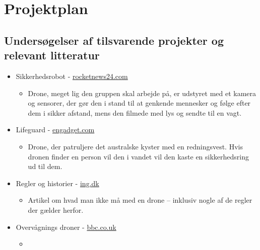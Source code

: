 \documentclass[Main]{subfiles}
\begin{document}
\chapter{Projektplan}


\section{Undersøgelser af tilsvarende projekter og relevant litteratur}


	\begin{itemize}
	\item Sikkerhedsrobot - \href{http://en.rocketnews24.com/2012/12/29/secom-unveils-worlds-first-flying-crime-prevention-robot/}{rocketnews24.com}
	
		\begin{itemize}
		\item Drone, meget lig den gruppen skal arbejde på, er udstyret med et kamera og sensorer, der gør den i stand til at genkende mennesker og følge efter dem i sikker afstand, mens den filmede med lys og sendte til en vagt.
		\end{itemize}
	
	
	\item Lifeguard - \href{http://www.engadget.com/2012/09/19/uav-lifeguards-to-patrol-australian-beaches/}{engadget.com}
	
		\begin{itemize}
		\item Drone, der patruljere det australske kyster med en redningsvest. 
		Hvis dronen finder en person vil den i vandet vil den kaste en  sikkerhedsring ud til dem.
		\end{itemize}
	
	
	\item Regler og historier - \href{http://ing.dk/artikel/foerste-droneflyver-meldt-til-politiet-159138}{ing.dk}
	
		\begin{itemize}
		\item Artikel om hvad man ikke må med en drone -- inklusiv nogle af de regler der gælder herfor.
		\end{itemize}
	
	
	\item Overvågnings droner - \href{http://www.bbc.co.uk/news/world-europe-22678580}{bbc.co.uk}
	
		\begin{itemize}
		\item 
		\end{itemize}
	

\end{itemize}
\end{document}
